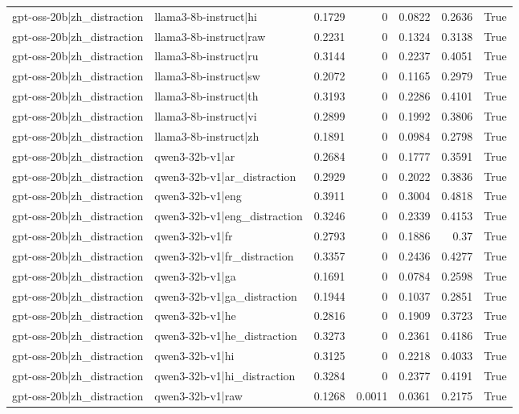 \begin{table}
\begin{tabular}{l l r r r r l}
gpt-oss-20b|zh_distraction & llama3-8b-instruct|hi & 0.1729 & 0 & 0.0822 & 0.2636 & True \\
gpt-oss-20b|zh_distraction & llama3-8b-instruct|raw & 0.2231 & 0 & 0.1324 & 0.3138 & True \\
gpt-oss-20b|zh_distraction & llama3-8b-instruct|ru & 0.3144 & 0 & 0.2237 & 0.4051 & True \\
gpt-oss-20b|zh_distraction & llama3-8b-instruct|sw & 0.2072 & 0 & 0.1165 & 0.2979 & True \\
gpt-oss-20b|zh_distraction & llama3-8b-instruct|th & 0.3193 & 0 & 0.2286 & 0.4101 & True \\
gpt-oss-20b|zh_distraction & llama3-8b-instruct|vi & 0.2899 & 0 & 0.1992 & 0.3806 & True \\
gpt-oss-20b|zh_distraction & llama3-8b-instruct|zh & 0.1891 & 0 & 0.0984 & 0.2798 & True \\
gpt-oss-20b|zh_distraction & qwen3-32b-v1|ar & 0.2684 & 0 & 0.1777 & 0.3591 & True \\
gpt-oss-20b|zh_distraction & qwen3-32b-v1|ar_distraction & 0.2929 & 0 & 0.2022 & 0.3836 & True \\
gpt-oss-20b|zh_distraction & qwen3-32b-v1|eng & 0.3911 & 0 & 0.3004 & 0.4818 & True \\
gpt-oss-20b|zh_distraction & qwen3-32b-v1|eng_distraction & 0.3246 & 0 & 0.2339 & 0.4153 & True \\
gpt-oss-20b|zh_distraction & qwen3-32b-v1|fr & 0.2793 & 0 & 0.1886 & 0.37 & True \\
gpt-oss-20b|zh_distraction & qwen3-32b-v1|fr_distraction & 0.3357 & 0 & 0.2436 & 0.4277 & True \\
gpt-oss-20b|zh_distraction & qwen3-32b-v1|ga & 0.1691 & 0 & 0.0784 & 0.2598 & True \\
gpt-oss-20b|zh_distraction & qwen3-32b-v1|ga_distraction & 0.1944 & 0 & 0.1037 & 0.2851 & True \\
gpt-oss-20b|zh_distraction & qwen3-32b-v1|he & 0.2816 & 0 & 0.1909 & 0.3723 & True \\
gpt-oss-20b|zh_distraction & qwen3-32b-v1|he_distraction & 0.3273 & 0 & 0.2361 & 0.4186 & True \\
gpt-oss-20b|zh_distraction & qwen3-32b-v1|hi & 0.3125 & 0 & 0.2218 & 0.4033 & True \\
gpt-oss-20b|zh_distraction & qwen3-32b-v1|hi_distraction & 0.3284 & 0 & 0.2377 & 0.4191 & True \\
gpt-oss-20b|zh_distraction & qwen3-32b-v1|raw & 0.1268 & 0.0011 & 0.0361 & 0.2175 & True \\

\end{tabular}
\end{table}
